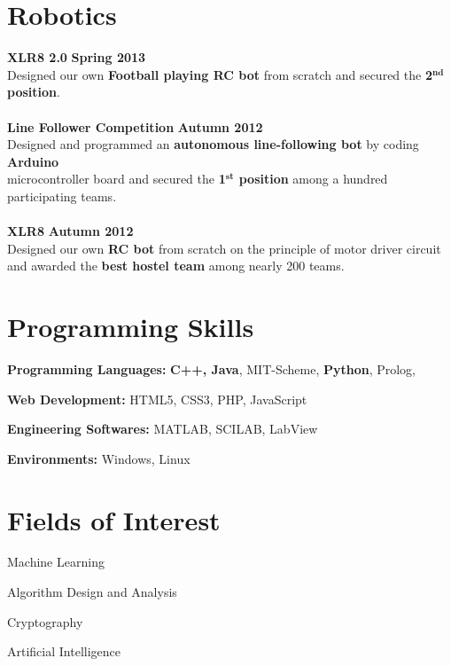 \documentclass[margin,11pt]{resume}
\begin{document}
\begin{resume}
\section{\mysidestyle Robotics}
\textbf{XLR8 2.0} \hfill \textbf{Spring 2013}\\
Designed our own \textbf{Football playing RC bot} from scratch and secured the \textbf{2$^{\textbf{nd}}$ position}.\\
\vspace{-2mm} \\
\textbf{Line Follower Competition} \hfill \textbf{Autumn 2012}\\
Designed and programmed an \textbf{autonomous line-following bot} by coding \textbf{Arduino} \\ microcontroller board and secured the \textbf{1$^{\textbf{st}}$ position} among a hundred participating teams.\\
\vspace{-2mm} \\
\textbf{XLR8}  \hfill \textbf{Autumn 2012}\\
Designed our own \textbf{RC bot} from scratch on the principle of motor driver circuit and awarded the \textbf{best hostel team} among nearly 200 teams. 

\pagebreak

\vspace{-150em}

\section{\mysidestyle Programming Skills}
\begin{list2}
\item \textbf{Programming Languages:} \textbf{C++, Java}, MIT-Scheme, \textbf{Python}, Prolog, \LaTeXe{}
\item \textbf{Web Development:} HTML5, CSS3, PHP, JavaScript
\item \textbf{Engineering Softwares:} MATLAB, SCILAB, LabView
\item \textbf{Environments:} Windows, Linux
\end{list2}

\section{\mysidestyle Fields of Interest}
\begin{list2}
\item Machine Learning
\item Algorithm Design and Analysis
\item Cryptography
\item Artificial Intelligence
\end{list2}


\end{resume}
\end{document}
